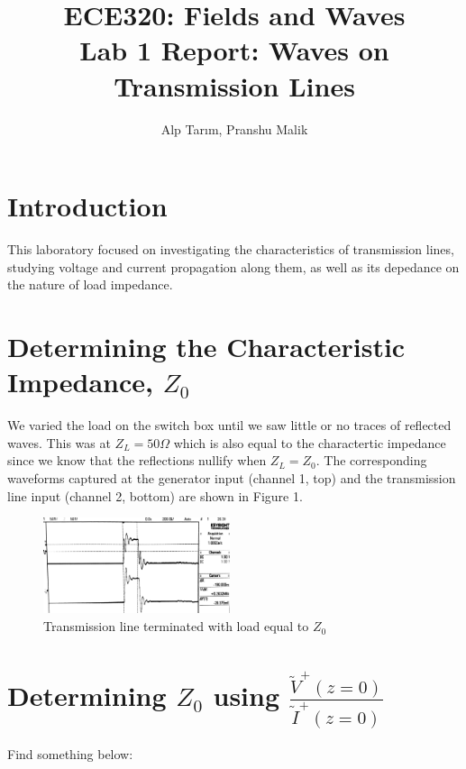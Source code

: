 \documentclass[10pt]{article}
\begin{document}
\title{\textbf{\Large{\textsc{ECE320:} Fields and Waves}} \\ \Large{Lab 1 Report: Waves on Transmission Lines}}
\author{Alp Tarım, Pranshu Malik}

\maketitle

\section{Introduction}

This laboratory focused on investigating the characteristics of transmission lines, studying voltage and current 
propagation along them, as well as its depedance on the nature of load impedance.


\section[Determining the Characteristic Impedance, Z0]{Determining the Characteristic Impedance, {$Z_0$}}

We varied the load on the switch box until we saw little or no traces of reflected waves.
This was at $Z_L = 50 \Omega$ which is also equal to the charactertic impedance 
since we know that the reflections nullify when $Z_L = Z_0$. The corresponding waveforms
captured at the generator input (channel 1, top) and the transmission line input (channel 2, bottom) 
are shown in Figure 1.

\begin{figure}[h]
    \centering
    \includegraphics[width=5.49cm]{../photos/lab1/load_matched.jpg}
    \caption{Transmission line terminated with load equal to $Z_0$}
    \label{simulation_figure}
\end{figure}


\section[Determining Z0 using V/I]{Determining $Z_0$ using $\frac{\tilde V^+(z=0)}{\tilde I^+(z=0)}$}

Find something below:
\end{document}
